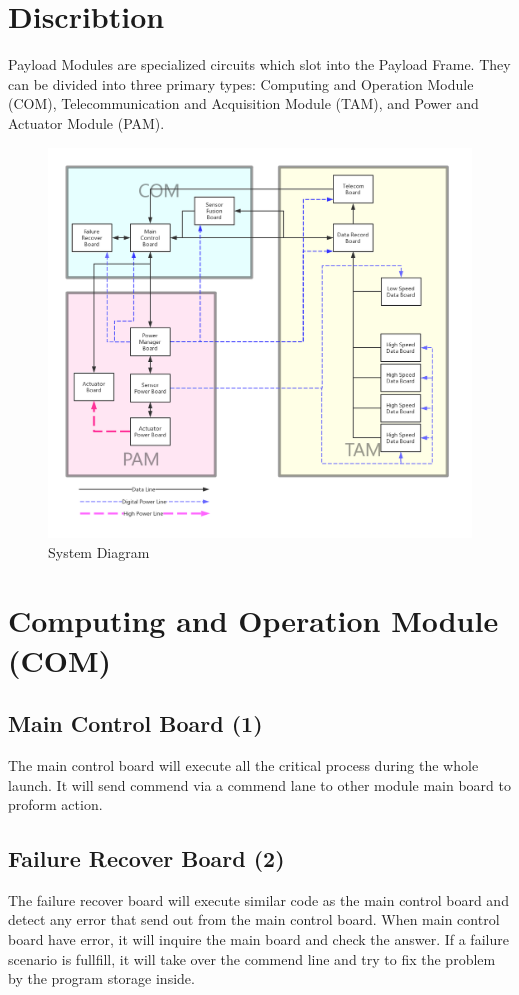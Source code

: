 \documentclass[12pt,article]{memoir}
\begin{document}
\section{Discribtion}
Payload Modules are specialized circuits which slot into the Payload Frame. They can be divided into three primary types: Computing and Operation Module (COM), Telecommunication and Acquisition Module (TAM), and Power and Actuator Module (PAM).
\begin{figure}[htp]
\includegraphics[width=\textwidth]{sysdia.png}
 \caption{System Diagram}	
\end{figure}
\section{Computing and Operation Module (COM)}
\subsection{Main Control Board (1)}
The main control board will execute all the critical process during the whole launch. It will send commend via a commend lane to other module main board to proform action.
\subsection{Failure Recover Board (2)}
The failure recover board will execute similar code as the main control board and detect any error that send out from the main control board. When main control board have error, it will inquire the main board and check the answer. If a failure scenario is fullfill, it will take over the commend line and try to fix the problem by the program storage inside.
\end{document}
